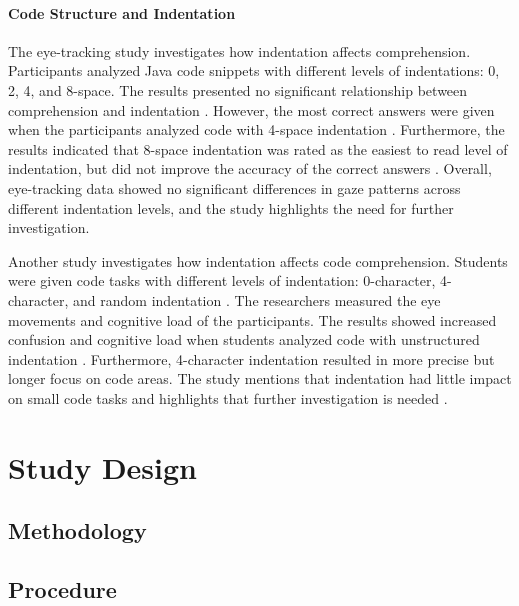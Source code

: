 \subsubsection{Code Structure and Indentation} 


The eye-tracking study \citet{bauer2017indentations} investigates how indentation affects comprehension. Participants analyzed Java code snippets with different levels of indentations: 0, 2, 4, and 8-space. The results presented no significant relationship between comprehension and indentation \citet{bauer2017indentations}. However, the most correct answers were given when the participants analyzed code with 4-space indentation . Furthermore, the results indicated that 8-space indentation was rated as the easiest to read level of indentation, but did not improve the accuracy of the correct answers \citet{bauer2017indentations}. Overall, eye-tracking data showed no significant differences in gaze patterns across different indentation levels, and the study highlights the need for further investigation. 



Another study \citet{yorimoto2024quantitative} investigates how indentation affects code comprehension. Students were given code tasks with different levels of indentation: 0-character, 4-character, and random indentation \citet{yorimoto2024quantitative}. The researchers measured the eye movements and cognitive load of the participants. The results showed increased confusion and cognitive load when students analyzed code with unstructured indentation \citet{yorimoto2024quantitative}. Furthermore, 4-character indentation resulted in more precise but longer focus on code areas. The study mentions that indentation had little impact on small code tasks and highlights that further investigation is needed \citet{yorimoto2024quantitative}.   



\chapter{Study Design}

\section{Methodology}

\section{Procedure}


